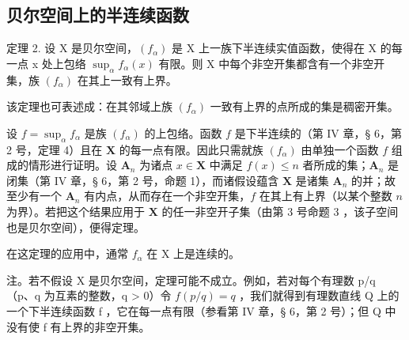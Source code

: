 \subsection{贝尔空间上的半连续函数}

定理 2. 设 X 是贝尔空间，\((f_{\alpha})\) 是 X 上一族下半连续实值函数，使得在 X 的每一点 x 处上包络 \(\sup_{\alpha} f_{\alpha}(x)\) 有限。则 X 中每个非空开集都含有一个非空开集，族 \((f_{\alpha})\) 在其上一致有上界。

该定理也可表述成：在其邻域上族 \((f_{\alpha})\) 一致有上界的点所成的集是稠密开集。

设 \(f = \sup_{\alpha} f_{\alpha}\) 是族 \((f_{\alpha})\) 的上包络。函数 \(f\) 是下半连续的（第 IV 章，§ 6，第 2 号，定理 4）且在 \(\mathbf{X}\) 的每一点有限。因此只需就族 \((f_{\alpha})\) 由单独一个函数 \(f\) 组成的情形进行证明。设 \(\mathbf{A}_n\) 为诸点 \(x \in \mathbf{X}\) 中满足 \(f(x) \leqslant n\) 者所成的集；\(\mathbf{A}_n\) 是闭集（第 IV 章，§ 6，第 2 号，命题 1），而诸假设蕴含 \(\mathbf{X}\) 是诸集 \(\mathbf{A}_n\) 的并；故至少有一个 \(\mathbf{A}_n\) 有内点，从而存在一个非空开集，\(f\) 在其上有上界（以某个整数 \(n\) 为界）。若把这个结果应用于 \(\mathbf{X}\) 的任一非空开子集（由第 3 号命题 3 ，该子空间也是贝尔空间），便得定理。

在这定理的应用中，通常 \(f_{\alpha}\) 在 X 上是连续的。

注。若不假设 X 是贝尔空间，定理可能不成立。例如，若对每个有理数 p/q （p、q 为互素的整数，q \textgreater{} 0）令 \(f(p/q) = q\) ，我们就得到有理数直线 Q 上的一个下半连续函数 f ，它在每一点有限（参看第 IV 章，§ 6，第 2 号）；但 Q 中没有使 f 有上界的非空开集。

